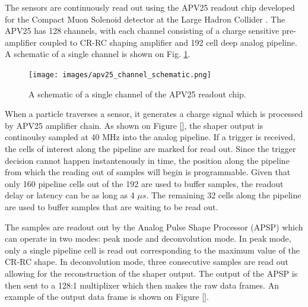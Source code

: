 The sensors are continuously read out using the APV25 readout chip developed for
the Compact Muon Solenoid detector at the Large Hadron Collider 
\cite{Raymond:2000ey}. The APV25 has 128 channels, with each channel consisting
of a charge sensitive pre-amplifier coupled to CR-RC shaping amplifier and 192
cell deep analog pipeline.  A schematic of a single channel is shown on 
Fig. \ref{fig:apv25_schem}.
\begin{figure}
    \centering
    \texttt{[image: images/apv25\_channel\_schematic.png]}
    \caption{A schematic of a single channel of the APV25 readout chip.}
    \label{fig:apv25_schem}
\end{figure}

When a particle traverses a sensor, it generates a charge signal which is 
processed by APV25 amplifier chain.  As shown on Figure \ref{}, the shaper output
is continoulsy sampled at 40 MHz into the analog pipeline. If a trigger is 
received, the cells of interest along the pipeline are marked for read out. 
Since the trigger decision cannot happen instantenously in time, the position
along the pipeline from which the reading out of samples will begin is 
programmable.  Given that only 160 pipeline cells out of the 192 are used
to buffer samples, the readout delay or latency can be as long as 4 $\mu s$.
The remaining 32 cells along the pipeline are used to buffer samples that are
waiting to be read out.

The samples  are readout out by the Analog Pulse Shape Processor (APSP) which
can operate in two modes: peak mode and deconvolution mode.  In peak
mode, only a single pipeline cell is read out corresponding to the maximum 
value of the CR-RC shape.  In deconvolution mode, three consecutive samples are
read out allowing for the reconstruction of the shaper output.  The output of 
the APSP is then sent to a 128:1 multiplixer which then makes the raw data 
frames.  An example of the output data frame is shown on Figure \ref{}.

